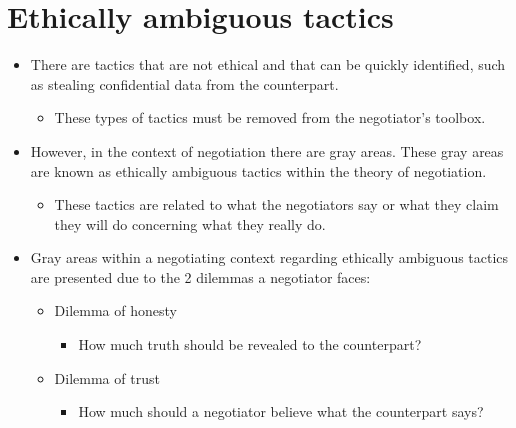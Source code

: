 \documentclass[
  ignorenonframetext,
]{beamer}
\providecommand{\tightlist}{%
  \setlength{\itemsep}{0pt}\setlength{\parskip}{0pt}}\usepackage{longtable,booktabs,array}
\begin{document}
\section{Ethically ambiguous tactics}\label{ethically-ambiguous-tactics}

\begin{frame}{}
\label{section-4}
\begin{itemize}
\item
  There are tactics that are not ethical and that can be quickly
  identified, such as stealing confidential data from the counterpart.

  \begin{itemize}
  \tightlist
  \item
    These types of tactics must be removed from the negotiator's
    toolbox.
  \end{itemize}
\item
  However, in the context of negotiation there are gray areas. These
  gray areas are known as ethically ambiguous tactics within the theory
  of negotiation.

  \begin{itemize}
  \tightlist
  \item
    These tactics are related to what the negotiators say or what they
    claim they will do concerning what they really do.
  \end{itemize}
\end{itemize}
\end{frame}

\begin{frame}{}
\label{section-5}
\begin{itemize}
\item
  Gray areas within a negotiating context regarding ethically ambiguous
  tactics are presented due to the 2 dilemmas a negotiator faces:

  \begin{itemize}
  \item
    Dilemma of honesty

    \begin{itemize}
    \tightlist
    \item
      How much truth should be revealed to the counterpart?
    \end{itemize}
  \item
    Dilemma of trust

    \begin{itemize}
    \tightlist
    \item
      How much should a negotiator believe what the counterpart says?
    \end{itemize}
  \end{itemize}
\end{itemize}
\end{frame}
\end{document}
